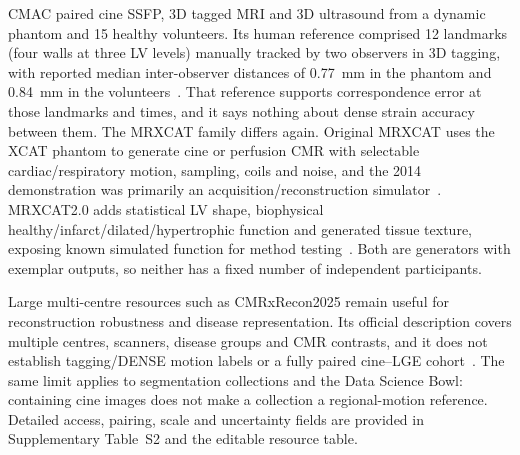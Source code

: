 CMAC paired cine SSFP, 3D tagged MRI and 3D ultrasound from a dynamic phantom and 15 healthy volunteers. Its human reference comprised 12 landmarks (four walls at three LV levels) manually tracked by two observers in 3D tagging, with reported median inter-observer distances of 0.77~mm in the phantom and 0.84~mm in the volunteers~\cite{tobongomez2013cmac,cmac2011}. That reference supports correspondence error at those landmarks and times, and it says nothing about dense strain accuracy between them. The MRXCAT family differs again. Original MRXCAT uses the XCAT phantom to generate cine or perfusion CMR with selectable cardiac/respiratory motion, sampling, coils and noise, and the 2014 demonstration was primarily an acquisition/reconstruction simulator~\cite{wissmann2014mrxcat}. MRXCAT2.0 adds statistical LV shape, biophysical healthy/infarct/dilated/hypertrophic function and generated tissue texture, exposing known simulated function for method testing~\cite{mrxcat2023,mrxcat2repo}. Both are generators with exemplar outputs, so neither has a fixed number of independent participants.

Large multi-centre resources such as CMRxRecon2025 remain useful for reconstruction robustness and disease representation. Its official description covers multiple centres, scanners, disease groups and CMR contrasts, and it does not establish tagging/DENSE motion labels or a fully paired cine--LGE cohort~\cite{cmrxrecon2025official}. The same limit applies to segmentation collections and the Data Science Bowl: containing cine images does not make a collection a regional-motion reference. Detailed access, pairing, scale and uncertainty fields are provided in Supplementary Table~S2 and the editable resource table.

